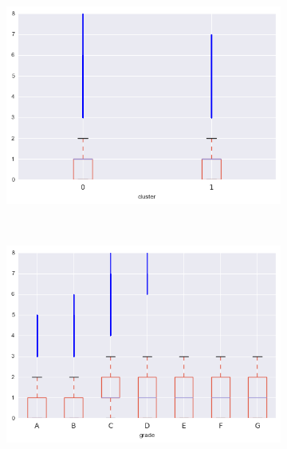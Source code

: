 \begin{apendicesenv}
\begin{figure}[t!]
\begin{subfigure}[t]{0.5\textwidth}
			\centerline{\includegraphics[width=1.05\textwidth]{img/inq_last_6mths_by_cluster}}
    	\end{subfigure}%
    	~ 
    	\begin{subfigure}[t]{0.5\textwidth}
    		\centering
   
			\centerline{\includegraphics[width=1.05\textwidth]{img/inq_last_6mths_by_grade}}

    	\end{subfigure}
\end{figure}

\begin{figure}[t!]
    \centering
        \caption{revol\textunderscore bal }
    	\begin{subfigure}[t]{0.5\textwidth}
    		\centering


\end{subfigure}
\end{figure}
\end{apendicesenv}
